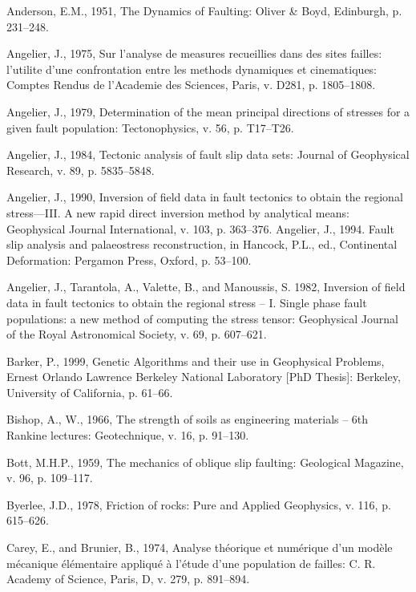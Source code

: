 \footnotesize
{
\setlength{\parindent}{0cm}
\begin{hangparas}{.25in}{1}
    
    Anderson, E.M., 1951, The Dynamics of Faulting: Oliver \& Boyd, Edinburgh, p. 231–248.
    
    Angelier, J., 1975, Sur l’analyse de measures recueillies dans des sites failles: l’utilite d’une confrontation entre les methods dynamiques et cinematiques: Comptes Rendus de l’Academie des Sciences, Paris, v. D281, p. 1805–1808.
    
    Angelier, J., 1979, Determination of the mean principal directions of stresses for a given fault population: Tectonophysics, v. 56, p. T17–T26.
    
    Angelier, J., 1984, Tectonic analysis of fault slip data sets: Journal of Geophysical Research, v. 89, p. 5835–5848.
    
    Angelier, J., 1990, Inversion of field data in fault tectonics to obtain the regional stress—III. A new rapid direct inversion method by analytical means: Geophysical Journal International, v. 103, p. 363–376.
    Angelier, J., 1994. Fault slip analysis and palaeostress reconstruction, in Hancock, P.L., ed., Continental Deformation: Pergamon Press, Oxford, p. 53–100.

    Angelier, J., Tarantola, A., Valette, B., and Manoussis, S. 1982, Inversion of field data in fault tectonics to obtain the regional stress – I. Single phase fault populations: a new method of computing the stress tensor: Geophysical Journal of the Royal Astronomical Society, v. 69, p. 607–621.

    Barker, P., 1999, Genetic Algorithms and their use in Geophysical Problems, Ernest Orlando Lawrence Berkeley National Laboratory [PhD Thesis]: Berkeley, University of California, p. 61–66.

    Bishop, A., W., 1966, The strength of soils as engineering materials – 6th Rankine lectures: Geotechnique, v. 16, p. 91–130.

    Bott, M.H.P., 1959, The mechanics of oblique slip faulting: Geological Magazine, v. 96, p. 109–117.

    Byerlee, J.D., 1978, Friction of rocks: Pure and Applied Geophysics, v. 116, p. 615–626.

    Carey, E., and Brunier, B., 1974, Analyse théorique et numérique d'un modèle mécanique élémentaire appliqué à l'étude d'une population de failles: C. R. Academy of Science, Paris, D, v. 279, p. 891–894.


\end{hangparas}}
